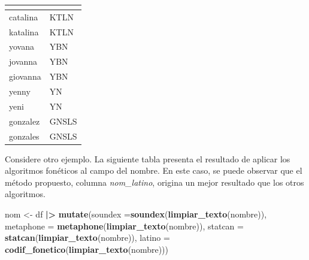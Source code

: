 \documentclass[
  12pt,
]{book}
\newenvironment{Shaded}{\begin{snugshade}}{\end{snugshade}}
\newcommand{\AttributeTok}[1]{\textcolor[rgb]{0.13,0.29,0.53}{#1}}
\newcommand{\FunctionTok}[1]{\textcolor[rgb]{0.13,0.29,0.53}{\textbf{#1}}}
\newcommand{\NormalTok}[1]{#1}
\newcommand{\OtherTok}[1]{\textcolor[rgb]{0.56,0.35,0.01}{#1}}
\newcommand{\SpecialCharTok}[1]{\textcolor[rgb]{0.81,0.36,0.00}{\textbf{#1}}}
\begin{document}
\begin{table}[t]
\fontsize{12.0pt}{14.0pt}\selectfont
\begin{tabular*}{\linewidth}{@{\extracolsep{\fill}}ll}
\toprule
{\bfseries \cellcolor[HTML]{F9F9F9}{nombre}} & {\bfseries \cellcolor[HTML]{F9F9F9}{codif}} \\ 
\midrule\addlinespace[2.5pt]
catalina & KTLN \\ 
katalina & KTLN \\ 
yovana & YBN \\ 
jovanna & YBN \\ 
giovanna & YBN \\ 
yenny & YN \\ 
yeni & YN \\ 
gonzalez & GNSLS \\ 
gonzales & GNSLS \\ 
\bottomrule
\end{tabular*}
\end{table}

Considere otro ejemplo. La siguiente tabla presenta el resultado de aplicar los algoritmos fonéticos al campo del nombre. En este caso, se puede observar que el método propuesto, columna \emph{nom\_latino}, origina un mejor resultado que los otros algoritmos.

\begin{Shaded}
\begin{Highlighting}[]
\NormalTok{nom }\OtherTok{\textless{}{-}}\NormalTok{ df }\SpecialCharTok{|\textgreater{}} 
       \FunctionTok{mutate}\NormalTok{(}\AttributeTok{soundex =}\FunctionTok{soundex}\NormalTok{(}\FunctionTok{limpiar\_texto}\NormalTok{(nombre)),}
              \AttributeTok{metaphone =} \FunctionTok{metaphone}\NormalTok{(}\FunctionTok{limpiar\_texto}\NormalTok{(nombre)),}
              \AttributeTok{statcan =} \FunctionTok{statcan}\NormalTok{(}\FunctionTok{limpiar\_texto}\NormalTok{(nombre)),}
              \AttributeTok{latino =} \FunctionTok{codif\_fonetico}\NormalTok{(}\FunctionTok{limpiar\_texto}\NormalTok{(nombre)))}
\end{Highlighting}
\end{Shaded}
\end{document}
